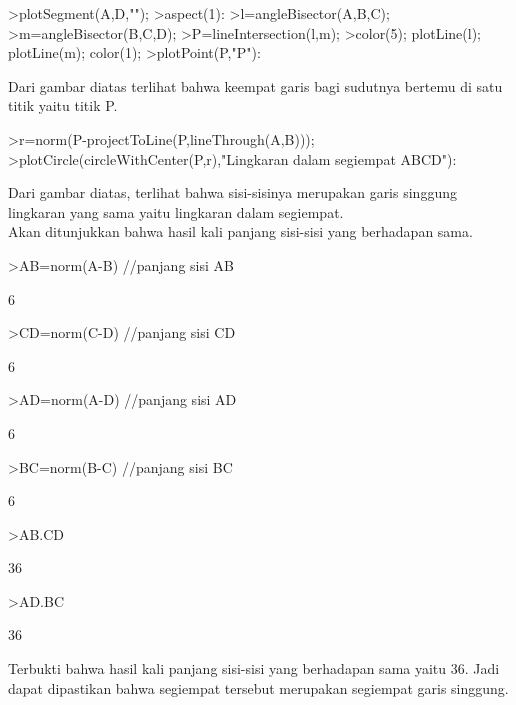 \documentclass[a4paper,10pt]{article}
\begin{document}
\begin{eulernotebook}
\begin{eulercomment}
\begin{eulercomment}
\begin{eulerprompt}
>plotSegment(A,D,"");
>aspect(1):
>l=angleBisector(A,B,C);
>m=angleBisector(B,C,D);
>P=lineIntersection(l,m);
>color(5); plotLine(l); plotLine(m); color(1);
>plotPoint(P,"P"):
\end{eulerprompt}
\begin{eulercomment}
Dari gambar diatas terlihat bahwa keempat garis bagi sudutnya bertemu
di satu titik yaitu titik P.
\end{eulercomment}
\begin{eulerprompt}
>r=norm(P-projectToLine(P,lineThrough(A,B)));
>plotCircle(circleWithCenter(P,r),"Lingkaran dalam segiempat ABCD"):
\end{eulerprompt}
\begin{eulercomment}
Dari gambar diatas, terlihat bahwa sisi-sisinya merupakan garis
singgung lingkaran yang sama yaitu lingkaran dalam segiempat.\\
Akan ditunjukkan bahwa hasil kali panjang sisi-sisi yang berhadapan
sama.
\end{eulercomment}
\begin{eulerprompt}
>AB=norm(A-B) //panjang sisi AB
\end{eulerprompt}
\begin{euleroutput}
  6
\end{euleroutput}
\begin{eulerprompt}
>CD=norm(C-D) //panjang sisi CD
\end{eulerprompt}
\begin{euleroutput}
  6
\end{euleroutput}
\begin{eulerprompt}
>AD=norm(A-D) //panjang sisi AD
\end{eulerprompt}
\begin{euleroutput}
  6
\end{euleroutput}
\begin{eulerprompt}
>BC=norm(B-C) //panjang sisi BC
\end{eulerprompt}
\begin{euleroutput}
  6
\end{euleroutput}
\begin{eulerprompt}
>AB.CD
\end{eulerprompt}
\begin{euleroutput}
  36
\end{euleroutput}
\begin{eulerprompt}
>AD.BC
\end{eulerprompt}
\begin{euleroutput}
  36
\end{euleroutput}
\begin{eulercomment}
Terbukti bahwa hasil kali panjang sisi-sisi yang berhadapan sama yaitu
36. Jadi dapat dipastikan bahwa segiempat tersebut merupakan segiempat
garis singgung.



\end{eulercomment}
\end{eulercomment}
\end{eulercomment}
\end{eulernotebook}
\end{document}
